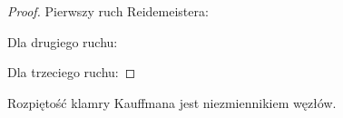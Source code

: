 \begin{proof}
    Pierwszy ruch Reidemeistera:
\begin{comment}
    \begin{align}
        \bracket{\MediumThinReidemeisterOneLeft} & \stackrel{K2}{=} A
        \bracket{\MediumReidemeisterOneSmoothA} +
        A^{-1} \bracket{\MediumReidemeisterOneSmoothB} \\ & \stackrel{K3}{=}
        A \bracket{\MediumThinReidemeisterOneStraight} +
        A^{-1}(-A^{-2}-A^2) \bracket{\MediumThinReidemeisterOneStraight} =
        -A^{-3}\bracket{\MediumThinReidemeisterOneStraight}
    \end{align}
\end{comment}
\noindent
Dla drugiego ruchu:
\begin{comment}
    \begin{align}
        \bracket{\MediumKauffmanReidemeisterTwoA} & \stackrel{K2}{=}
        A \bracket{\MediumKauffmanReidemeisterTwoB} +
        A^{-1} \bracket{\MediumKauffmanReidemeisterTwoC} \\ & \stackrel{K1}{=}
        -A^{-2} \bracket{\MediumThinBetaSmoothing} +
        A^{-1} \bracket{\MediumKauffmanReidemeisterTwoC} \\ & \stackrel{K2}{=}
        -A^{-2} \bracket{\MediumThinBetaSmoothing} +
        A^{-1}A \bracket{\MediumThinAlphaSmoothing} +
        A^{-1}A^{-1} \bracket{\MediumThinBetaSmoothing} \\ & =
        \bracket{\MediumThinAlphaSmoothing}
    \end{align}
\end{comment}
\noindent
Dla trzeciego ruchu:
\begin{comment}
    \begin{align}
    \bracket{\MediumKauffmanReidemeisterThreeA} & \stackrel{K2}{=}
    A \bracket{\MediumKauffmanReidemeisterThreeB} +
    A^{-1} \bracket{\MediumKauffmanReidemeisterThreeC} \stackrel{R2}{=}
    A \bracket{\MediumKauffmanReidemeisterThreeD} +
    A^{-1} \bracket{\MediumKauffmanReidemeisterThreeE} \\ & \stackrel{R2}{=}
    A \bracket{\MediumKauffmanReidemeisterThreeFlippedB} +
    A^{-1} \bracket{\MediumKauffmanReidemeisterThreeFlippedC} \stackrel{K2}{=}
    \bracket{\MediumKauffmanReidemeisterThreeFlippedA}. \qedhere
    \end{align}
\end{comment}
\end{proof}

\begin{corollary}
    Rozpiętość klamry Kauffmana jest niezmiennikiem węzłów.
\end{corollary}

